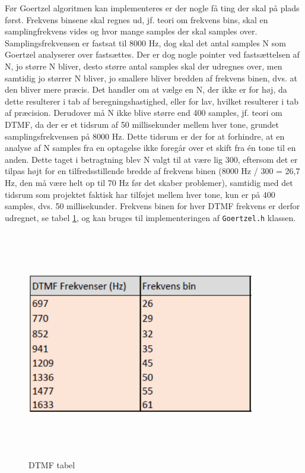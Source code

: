 Før Goertzel algoritmen kan implementeres er der nogle få ting der skal på plads først. Frekvens binsene skal regnes ud, jf. teori om frekvens bins, skal en samplingfrekvens vides og hvor mange samples der skal samples over. Samplingsfrekvensen er fastsat til 8000 Hz, dog skal det antal samples N som Goertzel analyserer over fastsættes. Der er dog nogle pointer ved fastsættelsen af N, jo større N bliver, desto større antal samples skal der udregnes over, men samtidig jo størrer N bliver, jo smallere bliver bredden af frekvens binen, dvs. at den bliver mere præcis. Det handler om at vælge en N, der ikke er for høj, da dette resulterer i tab af beregningshastighed, eller for lav, hvilket resulterer i tab af præcision.
\newline
Derudover må N ikke blive større end 400 samples, jf. teori om DTMF, da der er et tidsrum af 50 millisekunder mellem hver tone, grundet samplingsfrekvensen på 8000 Hz. Dette tidsrum er der for at forhindre, at en analyse af N samples fra en optagelse ikke foregår over et skift fra én tone til en anden.
\newline
Dette taget i betragtning blev N valgt til at være lig 300, eftersom det er tilpas højt for en tilfredsstillende bredde af frekvens binen (8000 Hz / 300 = 26,7 Hz, den må være helt op til 70 Hz før det skaber problemer), samtidig med det tidsrum som projektet faktisk har tilføjet mellem hver tone, kun er på 400 samples, dvs. 50 millisekunder.
\newline
Frekvens binen for hver DTMF frekvens er derfor udregnet, se tabel \ref{fig:tabel}, og kan bruges til implementeringen af \texttt{Goertzel.h} klassen.
\begin{figure}[ht]
	\centering
	\includegraphics[width=10cm,height=10cm,keepaspectratio]{pictures/DTMFtabel.png}
	\caption{DTMF tabel}
	\label{fig:tabel}
\end{figure}

